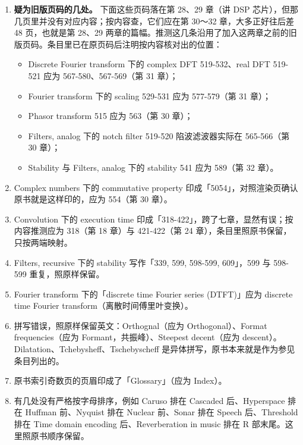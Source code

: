 \begin{enumerate}
\def\labelenumi{\arabic{enumi}.}
\tightlist
\item
  \textbf{疑为旧版页码的几处。} 下面这些页码落在第 28、29 章（讲 DSP
  芯片），但那几页里并没有对应内容；按内容查，它们应在第 30～32
  章，大多正好往后差 48 页，也就是第 28、29
  两章的篇幅。推测这几条沿用了加入这两章之前的旧版页码。条目里已在原页码后注明按内容核对出的位置：

  \begin{itemize}
  \tightlist
  \item
    Discrete Fourier transform 下的 complex DFT 519-532、real DFT
    519-521  应为 567-580、567-569（第 31 章）；
  \item
    Fourier transform 下的 scaling 529-531  应为 577-579（第
    31 章）；
  \item
    Phasor transform 515  应为 563（第 30 章）；
  \item
    Filters, analog 下的 notch filter 519-520 
    陷波滤波器实际在 565-566（第 30 章）；
  \item
    Stability 与 Filters, analog 下的 stability 541  应为
    589（第 32 章）。
  \end{itemize}
\item
  Complex numbers 下的 commutative property
  印成「5054」，对照渲染页确认原书就是这样印的，应为 554（第 30 章）。
\item
  Convolution 下的 execution time
  印成「318-422」，跨了七章，显然有误；按内容推测应为 318（第 18 章）与
  421-422（第 24 章），条目里照原书保留，只按两端映射。
\item
  Filters, recursive 下的 stability 写作「339, 599, 598-599, 609」，599
  与 598-599 重复，照原样保留。
\item
  Fourier transform 下的「discrete time Fourier series (DTFT)」应为
  discrete time Fourier transform（离散时间傅里叶变换）。
\item
  拼写错误，照原样保留英文：Orthognal（应为 Orthogonal）、Format
  frequencies（应为 Formant，共振峰）、Steepest decent（应为
  descent）。Dilatation、Tchebysheff、Tschebyscheff
  是异体拼写，原书本来就是作为参见条目列出的。
\item
  原书索引奇数页的页眉印成了「Glossary」（应为 Index）。
\item
  有几处没有严格按字母排序，例如 Caruso 排在 Cascaded 后、Hyperspace
  排在 Huffman 前、Nyquist 排在 Nuclear 前、Sonar 排在 Speech
  后、Threshold 排在 Time domain encoding 后、Reverberation in music
  排在 R 部末尾。这里照原书顺序保留。
\end{enumerate}

